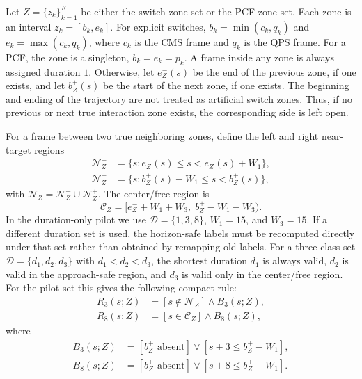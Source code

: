 \documentclass[10pt,twocolumn,letterpaper]{article}
\begin{document}
Let $Z=\{z_k\}_{k=1}^{K}$ be either the switch-zone set or the PCF-zone set. Each zone is an interval $z_k=[b_k,e_k]$. For explicit switches, $b_k=\min(c_k,q_k)$ and $e_k=\max(c_k,q_k)$, where $c_k$ is the CMS frame and $q_k$ is the QPS frame. For a PCF, the zone is a singleton, $b_k=e_k=p_k$. A frame inside any zone is always assigned duration $1$. Otherwise, let $e^-_Z(s)$ be the end of the previous zone, if one exists, and let $b^+_Z(s)$ be the start of the next zone, if one exists. The beginning and ending of the trajectory are not treated as artificial switch zones. Thus, if no previous or next true interaction zone exists, the corresponding side is left open.

For a frame between two true neighboring zones, define the left and right near-target regions
\begin{equation}
\begin{aligned}
\mathcal{N}_Z^- &= \{s:e_Z^-(s)\le s<e_Z^-(s)+W_1\},\\
\mathcal{N}_Z^+ &= \{s:b_Z^+(s)-W_1\le s<b_Z^+(s)\},
\end{aligned}
\end{equation}
with $\mathcal{N}_Z=\mathcal{N}_Z^-\cup\mathcal{N}_Z^+$. The center/free region is
\begin{equation}
\mathcal{C}_Z=
[e^-_Z+W_1+W_3,\;b^+_Z-W_1-W_3).
\end{equation}
In the duration-only pilot we use $\mathcal{D}=\{1,3,8\}$, $W_1=15$, and $W_3=15$. If a different duration set is used, the horizon-safe labels must be recomputed directly under that set rather than obtained by remapping old labels. For a three-class set $\mathcal{D}=\{d_1,d_2,d_3\}$ with $d_1<d_2<d_3$, the shortest duration $d_1$ is always valid, $d_2$ is valid in the approach-safe region, and $d_3$ is valid only in the center/free region. For the pilot set this gives the following compact rule:
\begin{equation}
\begin{aligned}
R_3(s;Z) &= [s\notin\mathcal{N}_Z]\wedge B_3(s;Z),\\
R_8(s;Z) &= [s\in\mathcal{C}_Z]\wedge B_8(s;Z),
\end{aligned}
\end{equation}
where
\begin{equation}
\begin{aligned}
B_3(s;Z) &= [b_Z^+\text{ absent}]
 \vee [s+3\le b_Z^+-W_1],\\
B_8(s;Z) &= [b_Z^+\text{ absent}]
 \vee [s+8\le b_Z^+-W_1].
\end{aligned}
\end{equation}
\end{document}
